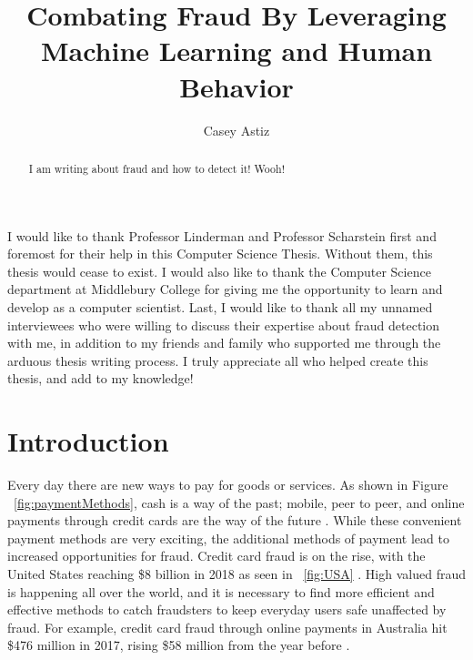 \documentclass[midd]{thesis}
\title {Combating Fraud By Leveraging Machine Learning and Human Behavior}
\author {Casey Astiz}
\begin{document}
\maketitle
{}

\begin{abstract}
I am writing about fraud and how to detect it! Wooh!
\end{abstract}

\begin{acknowledgements}
I would like to thank Professor Linderman and Professor Scharstein first and foremost for their help in this Computer Science Thesis. Without them, this thesis would cease to exist. I would also like to thank the Computer Science department at Middlebury College for giving me the opportunity to learn and develop as a computer scientist. Last, I would like to thank all my unnamed interviewees who were willing to discuss their expertise about fraud detection with me, in addition to my friends and family who supported me through the arduous thesis writing process. I truly appreciate all who helped create this thesis, and add to my knowledge!

\end{acknowledgements}

\contentspage
\tablelistpage   
\figurelistpage

\normalspacing \setcounter{page}{1} 

\chapter{Introduction}
\label{sec:intro}


Every day there are new ways to pay for goods or services. As shown in Figure ~\ref{fig:paymentMethods}, cash is a way of the past; mobile, peer to peer, and online payments through credit cards are the way of the future \cite{paymentMethods}. While these convenient payment methods are very exciting, the additional methods of payment lead to increased opportunities for fraud. Credit card fraud is on the rise, with the United States reaching \$8 billion in 2018 as seen in ~\ref{fig:USA}  \cite{USA}. High valued fraud is happening all over the world, and it is necessary to find more efficient and effective methods to catch fraudsters to keep everyday users safe unaffected by fraud. For example, credit card fraud through online payments in Australia hit \$476 million in 2017, rising \$58 million from the year before \cite{Wang2018}. 
\end{document}
